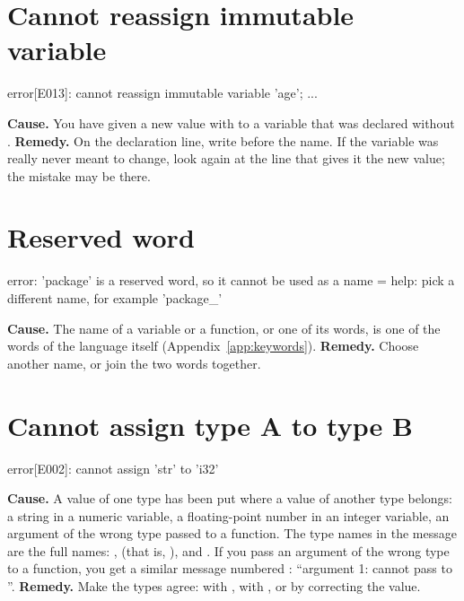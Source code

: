 \section*{Cannot reassign immutable variable}

\begin{plainout}
error[E013]: cannot reassign immutable variable 'age'; ...
\end{plainout}

\textbf{Cause.} You have given a new value with \code{=} to a variable that
was declared without .
\textbf{Remedy.} On the declaration line, write  before the name.
If the variable was really never meant to change, look again at the line
that gives it the new value; the mistake may be there.

\section*{Reserved word}

\begin{plainout}
error: 'package' is a reserved word, so it cannot be used as a name
  = help: pick a different name, for example 'package_'
\end{plainout}

\textbf{Cause.} The name of a variable or a function, or one of its words,
is one of the words of the language itself (Appendix~\ref{app:keywords}).
\textbf{Remedy.} Choose another name, or join the two words together.

\section*{Cannot assign type A to type B}

\begin{plainout}
error[E002]: cannot assign 'str' to 'i32'
\end{plainout}

\textbf{Cause.} A value of one type has been put where a value of another
type belongs: a string in a numeric variable, a floating-point number in an
integer variable, an argument of the wrong type passed to a function. The
type names in the message are the full names: ,  (that
is, ),  and . If you pass an argument of the
wrong type to a function, you get a similar message numbered :
``argument 1: cannot pass  to ''.
\textbf{Remedy.} Make the types agree: with , with
, or by correcting the value.

